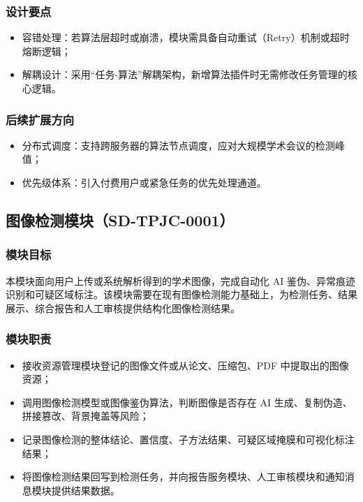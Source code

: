 \subsubsection{设计要点}
\begin{itemize}[leftmargin=2em]
    \item 容错处理：若算法层超时或崩溃，模块需具备自动重试（Retry）机制或超时熔断逻辑；
    \item 解耦设计：采用“任务-算法”解耦架构，新增算法插件时无需修改任务管理的核心逻辑。
\end{itemize}

\subsubsection{后续扩展方向}
\begin{itemize}[leftmargin=2em]
    \item 分布式调度：支持跨服务器的算法节点调度，应对大规模学术会议的检测峰值；
    \item 优先级体系：引入付费用户或紧急任务的优先处理通道。
\end{itemize}

\subsection{图像检测模块（SD-TPJC-0001）}

\subsubsection{模块目标}
本模块面向用户上传或系统解析得到的学术图像，完成自动化 AI 鉴伪、异常痕迹识别和可疑区域标注。该模块需要在现有图像检测能力基础上，为检测任务、结果展示、综合报告和人工审核提供结构化图像检测结果。

\subsubsection{模块职责}
\begin{itemize}[leftmargin=2em]
    \item 接收资源管理模块登记的图像文件或从论文、压缩包、PDF 中提取出的图像资源；
    \item 调用图像检测模型或图像鉴伪算法，判断图像是否存在 AI 生成、复制伪造、拼接篡改、背景掩盖等风险；
    \item 记录图像检测的整体结论、置信度、子方法结果、可疑区域掩膜和可视化标注结果；
    \item 将图像检测结果回写到检测任务，并向报告服务模块、人工审核模块和通知消息模块提供结果数据。
\end{itemize}

